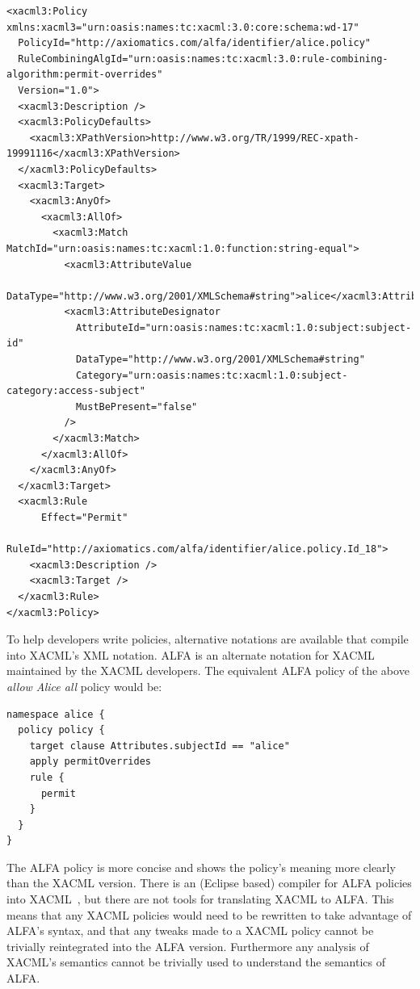 \documentclass[thesis.tex]{subfiles}
\begin{document}
\noindent\begin{minipage}{\linewidth}
\begin{lstlisting}
<xacml3:Policy xmlns:xacml3="urn:oasis:names:tc:xacml:3.0:core:schema:wd-17"
  PolicyId="http://axiomatics.com/alfa/identifier/alice.policy"
  RuleCombiningAlgId="urn:oasis:names:tc:xacml:3.0:rule-combining-algorithm:permit-overrides"
  Version="1.0">
  <xacml3:Description />
  <xacml3:PolicyDefaults>
    <xacml3:XPathVersion>http://www.w3.org/TR/1999/REC-xpath-19991116</xacml3:XPathVersion>
  </xacml3:PolicyDefaults>
  <xacml3:Target>
    <xacml3:AnyOf>
      <xacml3:AllOf>
        <xacml3:Match MatchId="urn:oasis:names:tc:xacml:1.0:function:string-equal">
          <xacml3:AttributeValue
            DataType="http://www.w3.org/2001/XMLSchema#string">alice</xacml3:AttributeValue>
          <xacml3:AttributeDesignator 
            AttributeId="urn:oasis:names:tc:xacml:1.0:subject:subject-id"
            DataType="http://www.w3.org/2001/XMLSchema#string"
            Category="urn:oasis:names:tc:xacml:1.0:subject-category:access-subject"
            MustBePresent="false"
          />
        </xacml3:Match>
      </xacml3:AllOf>
    </xacml3:AnyOf>
  </xacml3:Target>
  <xacml3:Rule 
      Effect="Permit"
      RuleId="http://axiomatics.com/alfa/identifier/alice.policy.Id_18">
    <xacml3:Description />
    <xacml3:Target />
  </xacml3:Rule>
</xacml3:Policy>
\end{lstlisting}
\end{minipage}

To help developers write policies, alternative notations are available that
compile into XACML's XML notation. ALFA is an alternate notation for
XACML~\cite{oasis_xacml_technical_comitee_abbreviated_2015} maintained by the
XACML developers. The equivalent ALFA policy of the above \emph{allow Alice all}
policy would be:

\noindent\begin{minipage}{\linewidth}
\begin{lstlisting}
namespace alice {
  policy policy {
    target clause Attributes.subjectId == "alice"
    apply permitOverrides
    rule {
      permit
    }
  }
}
\end{lstlisting}
\end{minipage}

The ALFA policy is more concise and shows the
policy's meaning more clearly than the XACML version.
There is an (Eclipse based) compiler for ALFA policies into
XACML~\cite{axiomaics_axiomatics_2012}, but there are not tools for
translating XACML to ALFA.  This means that any XACML policies would
need to be rewritten to take advantage of ALFA's syntax, and that any
tweaks made to a XACML policy cannot be trivially reintegrated into
the ALFA version.  Furthermore any analysis of XACML's semantics cannot
be trivially used to understand the semantics of ALFA.
\end{document}
